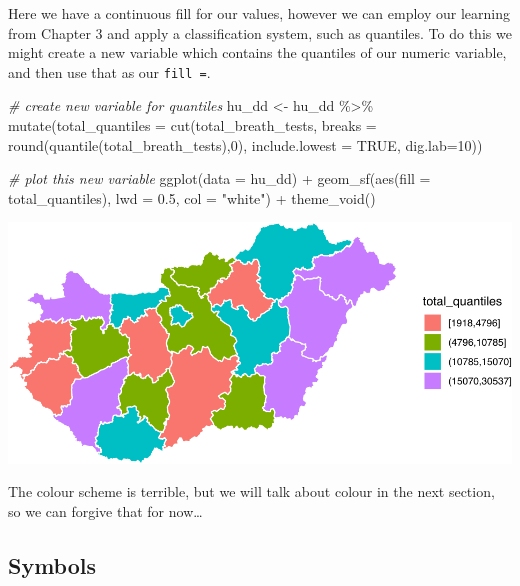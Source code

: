 \documentclass[
]{book}
\newenvironment{Shaded}{\begin{snugshade}}{\end{snugshade}}
\newcommand{\AttributeTok}[1]{\textcolor[rgb]{0.77,0.63,0.00}{#1}}
\newcommand{\CommentTok}[1]{\textcolor[rgb]{0.56,0.35,0.01}{\textit{#1}}}
\newcommand{\ConstantTok}[1]{\textcolor[rgb]{0.00,0.00,0.00}{#1}}
\newcommand{\DecValTok}[1]{\textcolor[rgb]{0.00,0.00,0.81}{#1}}
\newcommand{\FloatTok}[1]{\textcolor[rgb]{0.00,0.00,0.81}{#1}}
\newcommand{\FunctionTok}[1]{\textcolor[rgb]{0.00,0.00,0.00}{#1}}
\newcommand{\NormalTok}[1]{#1}
\newcommand{\OtherTok}[1]{\textcolor[rgb]{0.56,0.35,0.01}{#1}}
\newcommand{\SpecialCharTok}[1]{\textcolor[rgb]{0.00,0.00,0.00}{#1}}
\newcommand{\StringTok}[1]{\textcolor[rgb]{0.31,0.60,0.02}{#1}}
\begin{document}
Here we have a continuous fill for our values, however we can employ our learning from Chapter 3 and apply a classification system, such as quantiles. To do this we might create a new variable which contains the quantiles of our numeric variable, and then use that as our \texttt{fill\ =}.

\begin{Shaded}
\begin{Highlighting}[]
\CommentTok{\# create new variable for quantiles}
\NormalTok{hu\_dd }\OtherTok{\textless{}{-}}\NormalTok{ hu\_dd }\SpecialCharTok{\%\textgreater{}\%} 
  \FunctionTok{mutate}\NormalTok{(}\AttributeTok{total\_quantiles =} \FunctionTok{cut}\NormalTok{(total\_breath\_tests, }\AttributeTok{breaks =} \FunctionTok{round}\NormalTok{(}\FunctionTok{quantile}\NormalTok{(total\_breath\_tests),}\DecValTok{0}\NormalTok{), }\AttributeTok{include.lowest =} \ConstantTok{TRUE}\NormalTok{, }\AttributeTok{dig.lab=}\DecValTok{10}\NormalTok{))}

\CommentTok{\# plot this new variable}
\FunctionTok{ggplot}\NormalTok{(}\AttributeTok{data =}\NormalTok{ hu\_dd) }\SpecialCharTok{+} 
  \FunctionTok{geom\_sf}\NormalTok{(}\FunctionTok{aes}\NormalTok{(}\AttributeTok{fill =}\NormalTok{ total\_quantiles), }
          \AttributeTok{lwd =} \FloatTok{0.5}\NormalTok{, }
          \AttributeTok{col =} \StringTok{"white"}\NormalTok{) }\SpecialCharTok{+} 
  \FunctionTok{theme\_void}\NormalTok{()}
\end{Highlighting}
\end{Shaded}

\includegraphics{crime_mapping_files/figure-latex/unnamed-chunk-153-1.pdf}

The colour scheme is terrible, but we will talk about colour in the next section, so we can forgive that for now\ldots{}

\hypertarget{symbols}{%
\subsection{Symbols}\label{symbols}}
\end{document}
